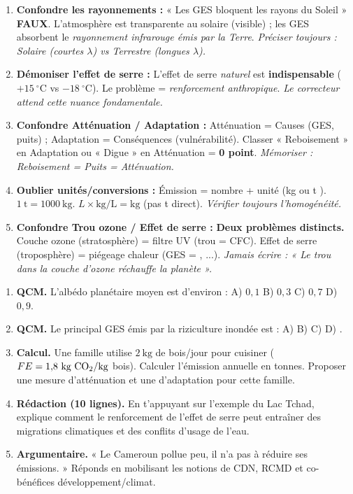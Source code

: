 \documentclass[11pt]{article}
\begin{document}
\begin{attention}
\begin{enumerate}
\item \textbf{Confondre les rayonnements :} « Les GES bloquent les rayons du Soleil » \textbf{FAUX}. L'atmosphère est transparente au solaire (visible) ; les GES absorbent le \emph{rayonnement infrarouge émis par la Terre}. \textit{Préciser toujours : Solaire (courtes $\lambda$) vs Terrestre (longues $\lambda$).}
\item \textbf{Démoniser l'effet de serre :} L'effet de serre \emph{naturel} est \textbf{indispensable} ($+15\ ^\circ\text{C}$ vs $-18\ ^\circ\text{C}$). Le problème = \emph{renforcement anthropique}. \textit{Le correcteur attend cette nuance fondamentale.}
\item \textbf{Confondre Atténuation / Adaptation :} Atténuation = Causes (GES, puits) ; Adaptation = Conséquences (vulnérabilité). Classer « Reboisement » en Adaptation ou « Digue » en Atténuation = \textbf{0 point}. \textit{Mémoriser : Reboisement = Puits = Atténuation.}
\item \textbf{Oublier unités/conversions :} Émission = nombre + unité (kg ou t ). $1\ \text{t} = 1000\ \text{kg}$. $L \times \text{kg/L} = \text{kg}$ (pas t direct). \textit{Vérifier toujours l'homogénéité.}
\item \textbf{Confondre Trou ozone / Effet de serre :} \textbf{Deux problèmes distincts.} Couche ozone (stratosphère) = filtre UV (trou = CFC). Effet de serre (troposphère) = piégeage chaleur (GES = , ...). \textit{Jamais écrire : « Le trou dans la couche d'ozone réchauffe la planète ».}
\end{enumerate}
\end{attention}

\begin{exercice}
\begin{enumerate}
\item \textbf{QCM.} L'albédo planétaire moyen est d'environ : A) $0{,}1$ B) $0{,}3$ C) $0{,}7$ D) $0{,}9$.
\item \textbf{QCM.} Le principal GES émis par la riziculture inondée est : A)  B)  C)  D) .
\item \textbf{Calcul.} Une famille utilise $2\ \text{kg}$ de bois/jour pour cuisiner ($FE = 1{,}8\ \text{kg}\ \ce{CO2}/\text{kg}$ bois). Calculer l'émission annuelle en tonnes. Proposer une mesure d'atténuation et une d'adaptation pour cette famille.
\item \textbf{Rédaction (10 lignes).} En t'appuyant sur l'exemple du Lac Tchad, explique comment le renforcement de l'effet de serre peut entraîner des migrations climatiques et des conflits d'usage de l'eau.
\item \textbf{Argumentaire.} « Le Cameroun pollue peu, il n'a pas à réduire ses émissions. » Réponds en mobilisant les notions de CDN, RCMD et co-bénéfices développement/climat.
\end{enumerate}
\end{exercice}
\end{document}
